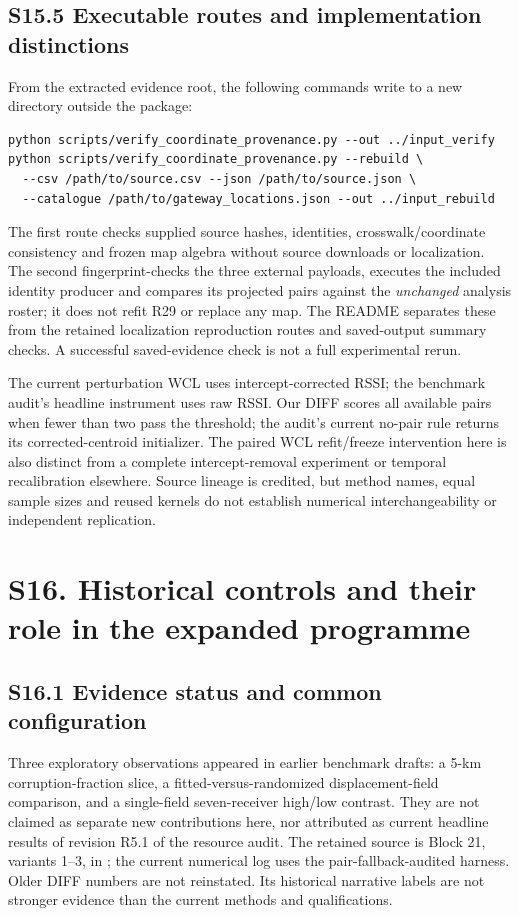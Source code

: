 \documentclass[journal,onecolumn,10pt]{IEEEtran}
\begin{document}
\subsection*{S15.5 Executable routes and implementation distinctions}
From the extracted evidence root, the following commands write to a new directory outside the package:
\begin{verbatim}
python scripts/verify_coordinate_provenance.py --out ../input_verify
python scripts/verify_coordinate_provenance.py --rebuild \
  --csv /path/to/source.csv --json /path/to/source.json \
  --catalogue /path/to/gateway_locations.json --out ../input_rebuild
\end{verbatim}
The first route checks supplied source hashes, identities, crosswalk/coordinate consistency and frozen map algebra without source downloads or localization. The second fingerprint-checks the three external payloads, executes the included identity producer and compares its projected pairs against the \emph{unchanged} analysis roster; it does not refit R29 or replace any map. The README separates these from the retained localization reproduction routes and saved-output summary checks. A successful saved-evidence check is not a full experimental rerun.

The current perturbation WCL uses intercept-corrected RSSI; the benchmark audit's headline instrument uses raw RSSI. Our DIFF scores all available pairs when fewer than two pass the threshold; the audit's current no-pair rule returns its corrected-centroid initializer. The paired WCL refit/freeze intervention here is also distinct from a complete intercept-removal experiment or temporal recalibration elsewhere. Source lineage is credited, but method names, equal sample sizes and reused kernels do not establish numerical interchangeability or independent replication.

\section*{S16. Historical controls and their role in the expanded programme}
\label{s16-historical-controls}

\subsection*{S16.1 Evidence status and common configuration}
Three exploratory observations appeared in earlier benchmark drafts: a 5-km corruption-fraction slice, a fitted-versus-randomized displacement-field comparison, and a single-field seven-receiver high/low contrast. They are not claimed as separate new contributions here, nor attributed as current headline results of revision R5.1 of the resource audit. The retained source is Block 21, variants 1--3, in ; the current numerical log uses the pair-fallback-audited harness. Older DIFF numbers are not reinstated. Its historical narrative labels are not stronger evidence than the current methods and qualifications.
\end{document}
